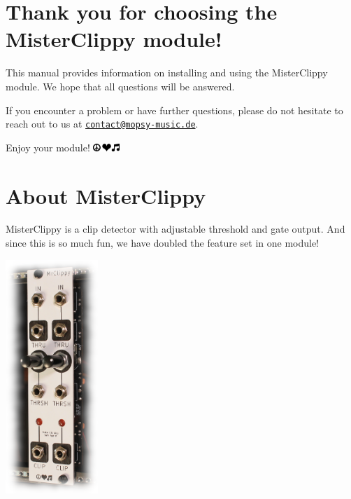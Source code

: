 \documentclass[a4paper,
               11pt,
               parskip=half,
               headinclude,
               titlepage=false]{scrartcl}
\begin{document}
\begin{minipage}[]{11cm}
\setlength{\parskip}{\medskipamount}
\section*{Thank you for choosing the MisterClippy module!}

This manual provides information on installing and using the MisterClippy module.
We hope that all questions will be answered.

If you encounter a problem or have further questions,
please do not hesitate to reach out to us at \href{mailto:contact@mopsy-music.de}{\texttt{contact@mopsy-music.de}}.


\vspace{1em}
\begin{center}
Enjoy your module! \quad \includegraphics[height=0.8em]{peace_love_music}
\end{center}


\section*{About MisterClippy}

MisterClippy is a clip detector with adjustable threshold and gate output.
And since this is so much fun, we have doubled the feature set in one module!

\end{minipage}%
\hspace{0.5cm}
\begin{minipage}[]{3.5cm}
\includegraphics[width=3.5cm]{MisterClippy-case-shot-frame}
\end{minipage}
\end{document}
